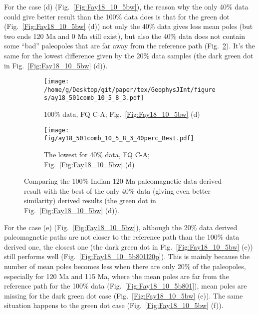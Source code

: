 For the case (d) (Fig.~\ref{Fig:Fay18_10_5bw}), the reason why the only 40\%
data could give better result than the 100\% data does is that for the green
dot (Fig.~\ref{Fig:Fay18_10_5bw} (d)) not only the 40\% data gives less mean
poles (but two ends 120 Ma and 0 Ma still exist), but also the 40\% data does
not contain some ``bad'' paleopoles that are far away from the reference path
(Fig.~\ref{Fig:Fay18_10_5w501l40p}). It's the same for the lowest difference
given by the 20\% data samples (the dark green dot in
Fig.~\ref{Fig:Fay18_10_5bw} (d)).

\begin{figure*}[tbp]
  \captionsetup[subfigure]{labelformat=empty,aboveskip=-6pt,belowskip=-6pt}
  \centering
  \begin{subfigure}[htbp]{.49\textwidth}
    \captionsetup{skip=0pt}
    \centering
    \texttt{[image: /home/g/Desktop/git/paper/tex/GeophysJInt/figures/ay18\_501comb\_10\_5\_8\_3.pdf]}
	\caption{100\% data, FQ C-A; Fig.~\ref{Fig:Fay18_10_5bw}
	(d)}\label{Fig:Fay18_10_5w501}
  \end{subfigure}
  \begin{subfigure}[htbp]{.49\textwidth}
    \captionsetup{skip=0pt}
    \centering
    \texttt{[image: fig/ay18\_501comb\_10\_5\_8\_3\_40perc\_Best.pdf]}  %
    \caption{The lowest for 40\% data, FQ C-A;
	Fig.~\ref{Fig:Fay18_10_5bw} (d)}\label{Fig:Fay18_10_5w501l40p}
  \end{subfigure}
  \caption[Less data, better similarity?]{Comparing the 100\% Indian
  120 Ma paleomagnetic data derived result with the best of the only
  40\% data (giving even better similarity) derived results (the green dot in
  Fig.~\ref{Fig:Fay18_10_5bw} (d)).}\label{Fig:Fay18_10_5w501l40p_vs_100p}
\end{figure*}

For the case (e) (Fig.~\ref{Fig:Fay18_10_5bw}), although the 20\% data derived
paleomagnetic paths are not closer to the reference path than the 100\% data
derived one, the closest one (the dark green dot in Fig.~\ref{Fig:Fay18_10_5bw}
(e)) still performs well (Fig.~\ref{Fig:Fay18_10_5b801l20p}). This is mainly
because the number of mean poles becomes less when there are only 20\% of the
paleopoles, especially for 120 Ma and 115 Ma, where the mean poles are far from
the reference path for the 100\% data (Fig.~\ref{Fig:Fay18_10_5b801}), mean
poles are missing for the dark green dot case (Fig.~\ref{Fig:Fay18_10_5bw} (e)).
The same situation happens to the green dot case (Fig.~\ref{Fig:Fay18_10_5bw}
(f)).

